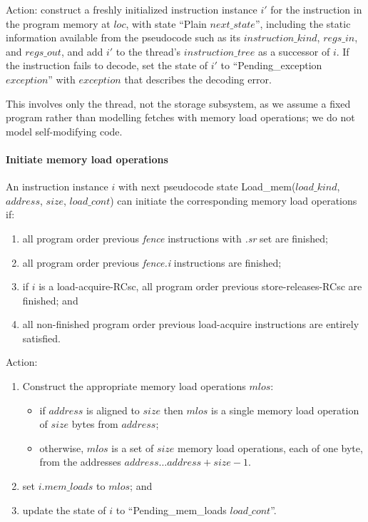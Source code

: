 Action: construct a freshly initialized instruction instance $i'$ for the instruction in the program memory at $loc$, with state ``{\sc Plain} $next\_state$'', including the static information available from the pseudocode such as its $instruction\_kind$, $regs\_in$, and $regs\_out$, and add $i'$ to the thread's $instruction\_tree$ as a successor of $i$. If the instruction fails to decode, set the state of $i'$ to ``{\sc Pending\_exception} $exception$'' with $exception$ that describes the decoding error.

\begin{commentary}
This involves only the thread, not the storage subsystem, as we assume a fixed program rather than modelling fetches with memory load operations; we do not model self-modifying code.
\end{commentary}


\paragraph{Initiate memory load operations}\label{omm:thread:initiate_mem_read}
An instruction instance $i$ with next pseudocode state {\sc Load\_mem}($load\_kind$, $address$, $size$, $load\_cont$) can initiate the corresponding memory load operations if:
\begin{enumerate}
\item all program order previous {\em fence} instructions with {\em .sr} set are finished;
\item all program order previous {\em fence.i} instructions are finished; 
\item if $i$ is a load-acquire-RCsc, all program order previous store-releases-RCsc are finished; and
\item all non-finished program order previous load-acquire instructions are entirely satisfied.
\end{enumerate}
Action:
\begin{enumerate}
\item Construct the appropriate memory load operations $mlos$:
  \begin{itemize}
  \item if $address$ is aligned to $size$ then $mlos$ is a single memory load operation of $size$ bytes from $address$;
  \item otherwise, $mlos$ is a set of $size$ memory load operations, each of one byte, from the addresses $address\ldots address+size-1$.
  \end{itemize}
\item set $i.mem\_loads$ to $mlos$; and
\item update the state of $i$ to ``{\sc Pending\_mem\_loads} $load\_cont$''.
\end{enumerate}


